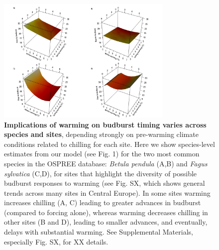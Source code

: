 \documentclass{article}
\begin{document}
\begin{figure}[h!]
\centering
\noindent \includegraphics[width=0.75\textwidth]{..//..//analyses/bb_analysis/figures/forecasting/tempforecastbothspp_1_7_degwarm_3D_utah.png}
\caption{\textbf{Implications of warming on budburst timing varies across species and sites}, depending strongly on pre-warming climate conditions related to chilling for each site. Here we show species-level estimates from our model (see Fig. 1) for the two most common species in the OSPREE database: \emph{Betula pendula} (A,B) and \emph{Fagus sylvatica} (C,D), for sites that highlight the diversity of possible budburst responses to warming (see Fig. SX, which shows general trends across many sites in Central Europe). In some sites warming increases chilling (A, C) leading to greater advances in budburst (compared to forcing alone), whereas warming decreases chilling in other sites (B and D), leading to smaller advances, and eventually, delays with substantial warming. See Supplemental Materials, especially Fig. SX, for XX details.}
\label{fig:fore}
\end{figure}

\end{document}
